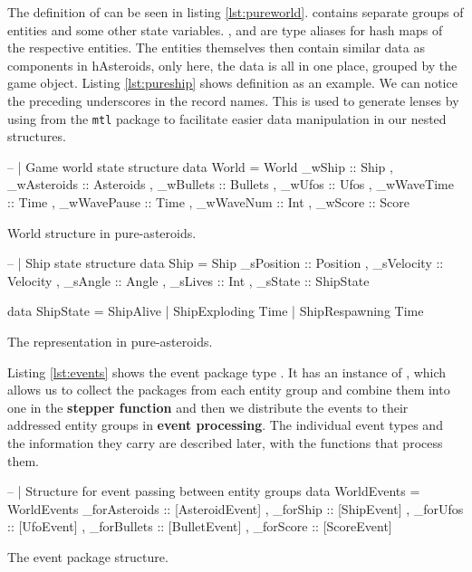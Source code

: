 \documentclass[
  digital, %
  color,   %
  table,   %
  oneside, %
  lof,     %
  lot,     %
]{fithesis3}
\newcommand{\packagename}{\texttt}
\begin{document}
The definition of  can be seen in listing \ref{lst:pureworld}.
 contains separate groups of entities and some other state variables.
,  and  are type
aliases for hash maps of the respective entities.
The entities themselves then contain similar data as components in hAsteroids,
only here, the data is all in one place, grouped by the game object.
Listing \ref{lst:pureship} shows  definition as an example.
We can notice the preceding underscores in the record names. This is used
to generate lenses by using  from the \packagename{mtl} package
to facilitate easier data manipulation in our nested structures.

\begin{listing}[H]
\begin{haskell}
-- | Game world state structure 
data World =
    World
    { _wShip      :: Ship 
    , _wAsteroids :: Asteroids
    , _wBullets   :: Bullets
    , _wUfos      :: Ufos
    , _wWaveTime  :: Time
    , _wWavePause :: Time
    , _wWaveNum   :: Int
    , _wScore     :: Score
    }
\end{haskell}
\caption{World structure in pure-asteroids.}
\label{lst:pureworld}
\end{listing}

\begin{listing}[H]
\begin{haskell}
-- | Ship state structure
data Ship =
    Ship 
    { _sPosition :: Position
    , _sVelocity :: Velocity
    , _sAngle    :: Angle
    , _sLives    :: Int
    , _sState    :: ShipState
    }

data ShipState
    = ShipAlive
    | ShipExploding Time
    | ShipRespawning Time
\end{haskell}
\caption{The  representation in pure-asteroids.}
\label{lst:pureship}
\end{listing}

Listing \ref{lst:events} shows the event package type . It
has an instance of , which allows us to collect the packages from
each entity group and combine them into one in the \textbf{stepper function}
and then we distribute the events to their addressed entity groups in \textbf{event processing}.
The individual event types and the information they carry are described later,
with the functions that process them.

\begin{listing}[H]
\begin{haskell}
-- | Structure for event passing between entity groups
data WorldEvents =
    WorldEvents
    { _forAsteroids :: [AsteroidEvent]
    , _forShip      :: [ShipEvent]
    , _forUfos      :: [UfoEvent]
    , _forBullets   :: [BulletEvent]
    , _forScore     :: [ScoreEvent]
    }
\end{haskell}
\caption{The event package structure.}
\label{lst:events}
\end{listing}
\end{document}
